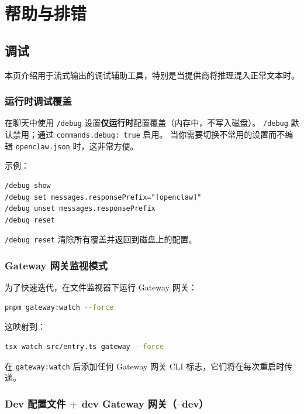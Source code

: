 \chapter{帮助与排错}

\section{调试}


本页介绍用于流式输出的调试辅助工具，特别是当提供商将推理混入正常文本时。

\subsection{运行时调试覆盖}


在聊天中使用 \texttt{/debug} 设置\textbf{仅运行时}配置覆盖（内存中，不写入磁盘）。
\texttt{/debug} 默认禁用；通过 \texttt{commands.debug: true} 启用。
当你需要切换不常用的设置而不编辑 \texttt{openclaw.json} 时，这非常方便。

示例：

\begin{lstlisting}
/debug show
/debug set messages.responsePrefix="[openclaw]"
/debug unset messages.responsePrefix
/debug reset
\end{lstlisting}


\texttt{/debug reset} 清除所有覆盖并返回到磁盘上的配置。

\subsection{Gateway 网关监视模式}


为了快速迭代，在文件监视器下运行 Gateway 网关：

\begin{lstlisting}[language=bash]
pnpm gateway:watch --force
\end{lstlisting}


这映射到：

\begin{lstlisting}[language=bash]
tsx watch src/entry.ts gateway --force
\end{lstlisting}


在 \texttt{gateway:watch} 后添加任何 Gateway 网关 CLI 标志，它们将在每次重启时传递。

\subsection{Dev 配置文件 + dev Gateway 网关（--dev）}


